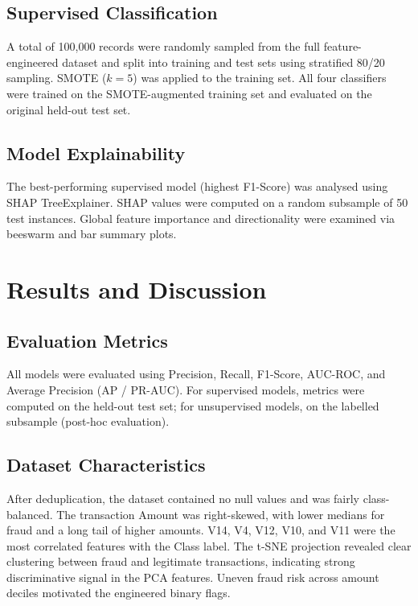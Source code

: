 \documentclass[conference]{IEEEtran}
\begin{document}
\subsection{Supervised Classification}
A total of 100,000 records were randomly sampled from the full feature-engineered dataset and split into training and test sets using stratified 80/20 sampling. SMOTE ($k=5$) was applied to the training set. All four classifiers were trained on the SMOTE-augmented training set and evaluated on the original held-out test set.

\subsection{Model Explainability}
The best-performing supervised model (highest F1-Score) was analysed using SHAP TreeExplainer. SHAP values were computed on a random subsample of 50 test instances. Global feature importance and directionality were examined via beeswarm and bar summary plots.

\section{Results and Discussion}

\subsection{Evaluation Metrics}
All models were evaluated using Precision, Recall, F1-Score, AUC-ROC, and Average Precision (AP / PR-AUC). For supervised models, metrics were computed on the held-out test set; for unsupervised models, on the labelled subsample (post-hoc evaluation).

\subsection{Dataset Characteristics}
After deduplication, the dataset contained no null values and was fairly class-balanced. The transaction Amount was right-skewed, with lower medians for fraud and a long tail of higher amounts. V14, V4, V12, V10, and V11 were the most correlated features with the Class label. The t-SNE projection revealed clear clustering between fraud and legitimate transactions, indicating strong discriminative signal in the PCA features. Uneven fraud risk across amount deciles motivated the engineered binary flags.
\end{document}
